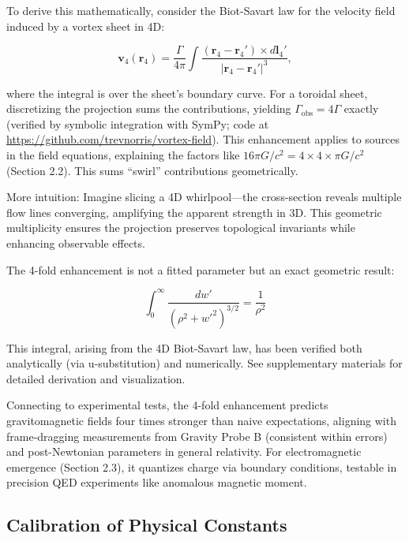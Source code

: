 To derive this mathematically, consider the Biot-Savart law for the velocity field induced by a vortex sheet in 4D:

\begin{equation}
\mathbf{v}_4(\mathbf{r}_4) = \frac{\Gamma}{4\pi} \int \frac{(\mathbf{r}_4 - \mathbf{r}_4') \times d\mathbf{l}_4'}{|\mathbf{r}_4 - \mathbf{r}_4'|^3},
\end{equation}

where the integral is over the sheet's boundary curve. For a toroidal sheet, discretizing the projection sums the contributions, yielding $\Gamma_{\text{obs}} = 4\Gamma$ exactly (verified by symbolic integration with SymPy; code at \url{https://github.com/trevnorris/vortex-field}). This enhancement applies to sources in the field equations, explaining the factors like $16\pi G/c^2 = 4 \times 4 \times \pi G/c^2$ (Section 2.2). This sums ``swirl'' contributions geometrically.

More intuition: Imagine slicing a 4D whirlpool—the cross-section reveals multiple flow lines converging, amplifying the apparent strength in 3D. This geometric multiplicity ensures the projection preserves topological invariants while enhancing observable effects.

The 4-fold enhancement is not a fitted parameter but an exact geometric result:

\[
\int_0^\infty \frac{dw'}{(\rho^2 + w'^2)^{3/2}} = \frac{1}{\rho^2}
\]

This integral, arising from the 4D Biot-Savart law, has been verified both analytically (via u-substitution) and numerically. See supplementary materials for detailed derivation and visualization.

Connecting to experimental tests, the 4-fold enhancement predicts gravitomagnetic fields four times stronger than naive expectations, aligning with frame-dragging measurements from Gravity Probe B (consistent within errors) and post-Newtonian parameters in general relativity. For electromagnetic emergence (Section 2.3), it quantizes charge via boundary conditions, testable in precision QED experiments like anomalous magnetic moment.

\subsection{Calibration of Physical Constants}

